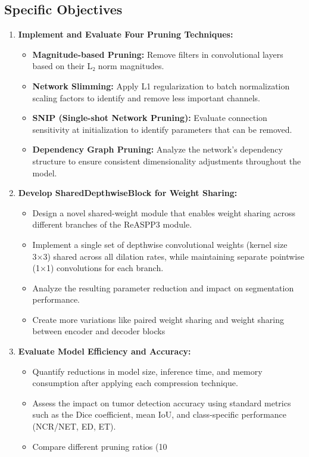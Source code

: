 \documentclass[conference]{IEEEtran}
\begin{document}
\subsection{Specific Objectives}
\begin{enumerate}[label=\textbf{\arabic*.}]
    \item \textbf{Implement and Evaluate Four Pruning Techniques:}
    \begin{itemize}[label=--]
        \item \textbf{Magnitude-based Pruning:} Remove filters in convolutional layers based on their L₂ norm magnitudes.
        \item \textbf{Network Slimming:} Apply L1 regularization to batch normalization scaling factors to identify and remove less important channels.
        \item \textbf{SNIP (Single-shot Network Pruning):} Evaluate connection sensitivity at initialization to identify parameters that can be removed.
        \item \textbf{Dependency Graph Pruning:} Analyze the network's dependency structure to ensure consistent dimensionality adjustments throughout the model.
    \end{itemize}

    \item \textbf{Develop  SharedDepthwiseBlock for Weight Sharing:}
    \begin{itemize}[label=--]
        \item Design a novel shared-weight module that enables weight sharing across different branches of the ReASPP3 module.
        \item Implement a single set of depthwise convolutional weights (kernel size 3×3) shared across all dilation rates, while maintaining separate pointwise (1×1) convolutions for each branch.
        \item Analyze the resulting parameter reduction and impact on segmentation performance.
        \item Create more variations like paired weight sharing and weight sharing between encoder and decoder blocks
    \end{itemize}
    
    \item \textbf{Evaluate Model Efficiency and Accuracy:}
    \begin{itemize}[label=--]
        \item Quantify reductions in model size, inference time, and memory consumption after applying each compression technique.
        \item Assess the impact on tumor detection accuracy using standard metrics such as the Dice coefficient, mean IoU, and class-specific performance (NCR/NET, ED, ET).
        \item Compare different pruning ratios (10%
    \end{itemize}
    

\end{enumerate}
\end{document}
